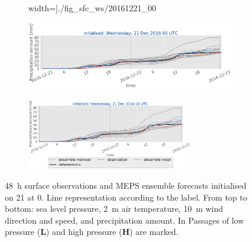 \begin{figure}[H]
\begin{subfigure}[b]{0.9\textwidth}
		width=\textwidth]{./fig_sfc_ws/20161221_00}
		\caption{}\label{fig:res:sfc_ws21}
	\end{subfigure}
	\begin{subfigure}[b]{0.9\textwidth}
		\includegraphics[trim={0.cm 1.5cm 0cm 0cm},clip,
		width=\textwidth]{./fig_sfc_precip/20161221_00}
		\caption{}\label{fig:res:sfc_precip21}
	\end{subfigure}
	\begin{subfigure}[b]{\textwidth}
		\centering
		\includegraphics[trim={5.5cm 0cm 5.cm 17.7cm},clip,
		width=0.8\textwidth]{./fig_sfc_precip/20161221_00_label}
	\end{subfigure}
	\caption{\SI{48}{\hour} surface observations and MEPS ensemble forecasts initialised on \SI{21}{\dec} at \SI{0}{\UTC}. 
		Line representation according to the label. From top to bottom: sea level pressure, \SI{2}{\metre} air temperature, \SI{10}{\metre} wind direction and speed, and precipitation amount. In \protect{} Passages of low pressure (\textbf{L}) and high pressure (\textbf{H}) are marked.}\label{fig:obs_meps:21}
\end{figure}
